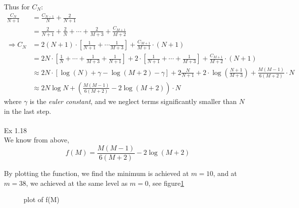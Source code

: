 \documentclass{article}
\begin{document}
Thus for $C_N$:
\begin{align*}
	\frac{C_N}{N+1} &= \frac{C_{N-1}}{N} + \frac{2}{N+1} \\
					&= \frac{2}{N+1} + \frac{2}{N} + \cdots + \frac{2}{M+3} + \frac{C_{M+1}}{M+2} \\
			\Rightarrow	C_N &= 2 (N+1) \cdot [ \frac{1}{N+1} + \cdots  \frac{1}{M+3}] + \frac{C_{M+1}}{M+1} \cdot (N+1) \\
			&= 2N \cdot [\frac{1}{N} + \cdots + \frac{1}{M+3} + \frac{1}{N+1}] + 2 \cdot [\frac{1}{N+1} + \cdots + \frac{1}{M+3}] + \frac{C_{M+1}}{M+2} \cdot (N+1) \\
			&\approx 2N \cdot [\log(N) + \gamma - \log(M+2) - \gamma] + 2 \frac{N}{N+1} + 2 \cdot \log(\frac{N+1}{M+3}) + \frac{M(M-1)}{6(M+2)} \cdot N \\
			&\approx 2N\log N + (\frac{M(M-1)}{6(M+2)} - 2 \log (M+2)) \cdot N
\end{align*}	
where $\gamma$ is the \emph{euler constant}, and we neglect terms significantly smaller than $N$ in the last step.
\\
\\
Ex 1.18 \\
We know from above, 
\[
	f(M) = \frac{M(M-1)}{6(M+2)} - 2 \log (M+2)
\]

By plotting the function, we find the minimum is achieved at $m = 10$, and at $m = 38$, we achieved at the same level as $m = 0$, see figure\ref{fMplot}

\begin{figure}
	\caption{plot of f(M)}\label{fMplot}
\end{figure}
\end{document}
